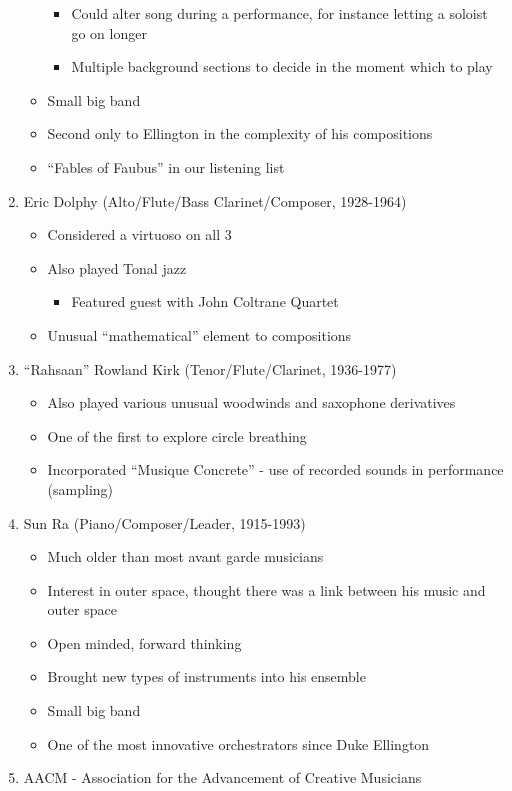 \documentclass[]{article}
\providecommand{\tightlist}{%
  \setlength{\itemsep}{0pt}\setlength{\parskip}{0pt}}
\begin{document}
\begin{enumerate}
\begin{itemize}
    \begin{itemize}
    \tightlist
    \item
      Could alter song during a performance, for instance letting a
      soloist go on longer
    \item
      Multiple background sections to decide in the moment which to play
    \end{itemize}
  \item
    Small big band
  \item
    Second only to Ellington in the complexity of his compositions
  \item
    ``Fables of Faubus'' in our listening list
  \end{itemize}
\item
  Eric Dolphy (Alto/Flute/Bass Clarinet/Composer, 1928-1964)

  \begin{itemize}
  \tightlist
  \item
    Considered a virtuoso on all 3
  \item
    Also played Tonal jazz

    \begin{itemize}
    \tightlist
    \item
      Featured guest with John Coltrane Quartet
    \end{itemize}
  \item
    Unusual ``mathematical'' element to compositions
  \end{itemize}
\item
  ``Rahsaan'' Rowland Kirk (Tenor/Flute/Clarinet, 1936-1977)

  \begin{itemize}
  \tightlist
  \item
    Also played various unusual woodwinds and saxophone derivatives
  \item
    One of the first to explore circle breathing
  \item
    Incorporated ``Musique Concrete'' - use of recorded sounds in
    performance (sampling)
  \end{itemize}
\item
  Sun Ra (Piano/Composer/Leader, 1915-1993)

  \begin{itemize}
  \tightlist
  \item
    Much older than most avant garde musicians
  \item
    Interest in outer space, thought there was a link between his music
    and outer space
  \item
    Open minded, forward thinking
  \item
    Brought new types of instruments into his ensemble
  \item
    Small big band
  \item
    One of the most innovative orchestrators since Duke Ellington
  \end{itemize}
\item
  AACM - Association for the Advancement of Creative Musicians


\end{enumerate}
\end{document}
